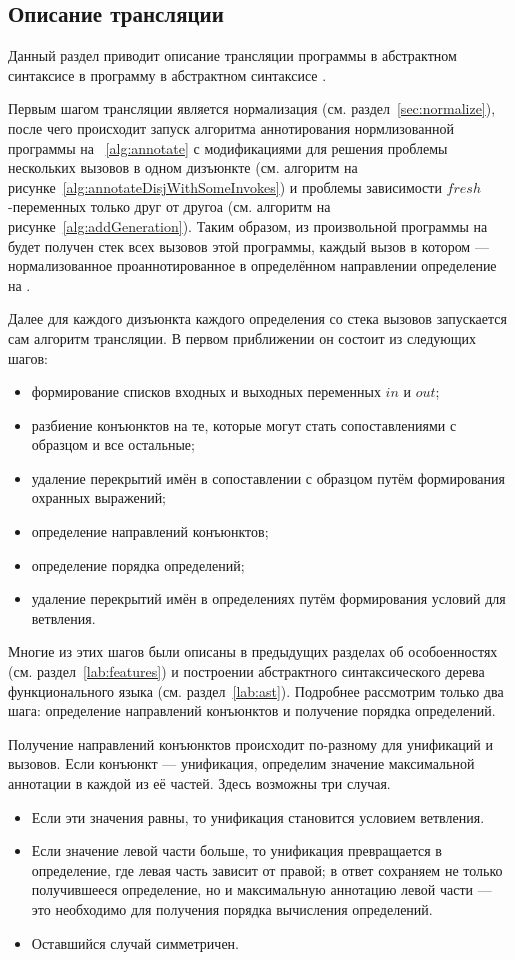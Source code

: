 \subsection{Описание трансляции}

Данный раздел приводит описание трансляции программы в абстрактном синтаксисе \miniKanren{} в программу в абстрактном синтаксисе \haskell{}.

Первым шагом трансляции является нормализация (см. раздел~\ref{sec:normalize}), после чего происходит запуск алгоритма аннотирования нормлизованной программы на \miniKanren{}~\ref{alg:annotate} с модификациями для решения проблемы нескольких вызовов в одном дизъюнкте (см. алгоритм на рисунке~\ref{alg:annotateDisjWithSomeInvokes}) и проблемы зависимости $fresh$-переменных только друг от другоа (см. алгоритм на рисунке~\ref{alg:addGeneration}).
Таким образом, из произвольной программы на \miniKanren{} будет получен стек всех вызовов этой программы, каждый вызов в котором --- нормализованное проаннотированное в определённом направлении определение на \miniKanren{}.

Далее для каждого дизъюнкта каждого определения со стека вызовов запускается сам алгоритм трансляции.
В первом приближении он состоит из следующих шагов:
\begin{itemize}
    \item формирование списков входных и выходных переменных $in$ и $out$;
    \item разбиение конъюнктов на те, которые могут стать сопоставлениями с образцом и все остальные;
    \item удаление перекрытий имён в сопоставлении с образцом путём формирования охранных выражений;
    \item определение направлений конъюнктов;
    \item определение порядка определений;
    \item удаление перекрытий имён в определениях путём формирования условий для ветвления.
\end{itemize}

Многие из этих шагов были описаны в предыдущих разделах об особоенностях \miniKanren{} (см. раздел~\ref{lab:features}) и построении абстрактного синтаксического дерева функционального языка (см. раздел~\ref{lab:ast}).
Подробнее рассмотрим только два шага: определение направлений конъюнктов и получение порядка определений.

Получение направлений конъюнктов происходит по-разному для унификаций и вызовов.
Если конъюнкт --- унификация, определим значение максимальной аннотации в каждой из её частей.
Здесь возможны три случая.
\begin{itemize}
    \item Если эти значения равны, то унификация становится условием ветвления.
    \item Если значение левой части больше, то унификация превращается в определение, где левая часть зависит от правой; в ответ сохраняем не только получившееся определение, но и максимальную аннотацию левой части --- это необходимо для получения порядка вычисления определений.
    \item Оставшийся случай симметричен.
\end{itemize}

